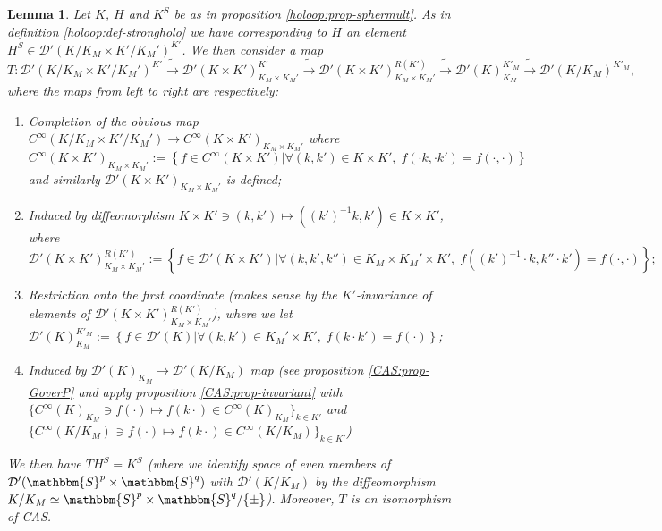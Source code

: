 \documentclass{article}
\newcommand{\assign}{:=}
\newtheorem{lemma}{Lemma}
\begin{document}
\begin{lemma}
  \label{holoop:lem-sphermult-aux}Let $K$, $H$ and $K^S$ be as in proposition
  \ref{holoop:prop-sphermult}. As in definition \ref{holoop:def-strongholo} we
  have corresponding to $H$ an element $H^S \in \mathcal{D}' (K / K_M \times
  K' / K_M')^{K'}$. We then consider a map
  \[ T : \mathcal{D}' (K / K_M \times K' / K_M')^{K'} \tilde{\rightarrow}
     \mathcal{D}' (K \times K')_{K_M \times K_M'}^{K'} \tilde{\rightarrow}
     \mathcal{D}' (K \times K')_{K_M \times K_M'}^{R (K')} \tilde{\rightarrow}
     \mathcal{D}' (K)^{K'_M}_{K_M} \tilde{\rightarrow} \mathcal{D}' (K /
     K_M)^{K'_M}, \]
  where the maps from left to right are respectively:
  \begin{enumerate}
    \item Completion of the obvious map $C^{\infty} (K / K_M \times K' / K_M')
    \rightarrow C^{\infty} (K \times K')_{K_M \times K_M'}$ where
    \[ C^{\infty} (K \times K')_{K_M \times K_M'} \assign \left\{ f \in
       C^{\infty} (K \times K') \big| \forall (k, k') \in K \times K', \; f
       (\cdot k, \cdot k') = f (\cdot, \cdot) \right\} \]
    and similarly $\mathcal{D}' (K \times K')_{K_M \times K_M'}$ is defined;
    
    \item Induced by diffeomorphism $K \times K' \ni (k, k') \mapsto ((k')^{-
    1} k, k') \in K \times K'$, where
    \[ \mathcal{D}' (K \times K')_{K_M \times K_M'}^{R (K')} \assign \left\{
       f \in \mathcal{D}' (K \times K')_{} \big| \forall (k, k', k'') \in
       K_M \times K_M' \times K', \; f ((k')^{- 1} \cdot k, k'' \cdot k') = f
       (\cdot, \cdot) \right\} ; \]
    \item Restriction onto the first coordinate (makes sense by the
    $K'$-invariance of elements of $\mathcal{D}' (K \times K')^{R (K')}_{K_M
    \times K_M'}$), where we let $\mathcal{D}' (K)^{K'_M}_{K_M} \assign
    \left\{ f \in \mathcal{D}' (K) \big| \forall (k, k') \in K_M' \times
    K', \; f (k \cdot k') = f (\cdot) \right\}$;
    
    \item Induced by $\mathcal{D}' (K)_{K_M} \rightarrow \mathcal{D}' (K /
    K_M)$ map (see proposition \ref{CAS:prop-GoverP} and apply proposition
    \ref{CAS:prop-invariant} with $\{ C^{\infty} (K)_{K_M} \ni f (\cdot)
    \mapsto f (k \cdot) \in C^{\infty} (K)_{K_M} \}_{k \in K'}$ and $\{
    C^{\infty} (K / K_M)_{} \ni f (\cdot) \mapsto f (k \cdot) \in C^{\infty}
    (K / K_M)_{} \}_{k \in K'}$)
  \end{enumerate}
  We then have $T H^S = K^S$ (where we identify space of even members of
  $\mathcal{D}' (\mathbbm{S}^p \times \mathbbm{S}^q)$ with $\mathcal{D}' (K /
  K_M)$ by the diffeomorphism $K / K_M \simeq \mathbbm{S}^p \times
  \mathbbm{S}^q / \{ \pm \}$). Moreover, $T$ is an isomorphism of CAS.
\end{lemma}
\end{document}
